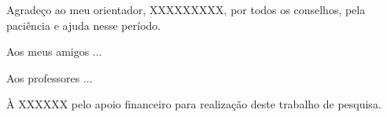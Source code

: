 \begin{agradecimentos}


Agradeço ao meu orientador, XXXXXXXXX, por todos os conselhos, pela paciência e ajuda nesse período.

Aos meus amigos ...

Aos professores ...

À XXXXXX pelo apoio financeiro para realização deste trabalho de pesquisa.

\end{agradecimentos}
